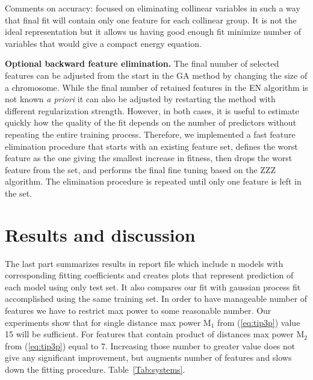 \documentclass[aps,prl,reprint,amsmath,amssymb,nature]{revtex4-1}
\begin{document}
Comments on accuracy: focused on eliminating collinear variables in such a way that final fit will contain only one feature for each collinear group. It is not the ideal representation but it allows us having good enough fit minimize number of variables that would give a compact energy equation. 

\textbf{Optional backward feature elimination.} 
The final number of selected features can be adjusted from the start in the GA method by changing the size of a chromosome. 
While the final number of retained features in the EN algorithm is not known \emph{a priori} it can also be adjusted by restarting the method with different regularization strength. 
However, in both cases, it is useful to estimate quickly how the quality of the fit depends on the number of predictors without repeating the entire training process. 
Therefore, we implemented a fast feature elimination procedure that starts with an existing feature set, defines the worst feature as the one giving the smallest increase in fitness, then drops the worst feature from the set, and performs the final fine tuning based on the ZZZ algorithm.  The elimination procedure is repeated until only one feature is left in the set.



\section{Results and discussion}

The last part summarizes results in report file which include n models 
with corresponding fitting coefficients and creates plots that represent 
prediction of each model using only test set. It also compares our fit 
with gaussian process fit accomplished using the same training set. In 
order to have manageable number of features we have to restrict max power to some reasonable number. Our experiments show that for single distance max power M$_{1}$ from (\ref{eq:tip3p}) value 15 will be sufficient. For features that contain product of distances max power M$_{2}$ from (\ref{eq:tip3p}) 
equal to 7. Increasing those number to greater value does not give any 
significant improvement, but augments number of features and slows down 
the fitting procedure. Table~\ref{Tab:systems}.
\end{document}
